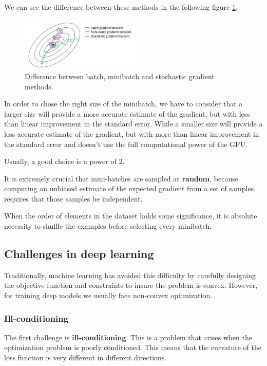 We can see the difference between these methods in the following figure \ref{fig:batchminibatch}.
\begin{figure}[!ht]
    \centering
    \includegraphics[width=0.5\textwidth]{img/minibatchvsbatch.png}
    \caption{Difference between batch, minibatch and stochastic gradient methods.}
    \label{fig:batchminibatch}
\end{figure}

In order to chose the right size of the minibatch, we have to consider that a
larger size will provide a more accurate estimate of the gradient, but with less
than linear improvement in the standard error. While a smaller size will provide
a less accurate estimate of the gradient, but with more than linear improvement
in the standard error and doesn't use the full computational power of the GPU.

\begin{note}
    Usually, a good choice is a power of 2.
\end{note}

It is extremely crucial that mini-batches are sampled at \textbf{random}, because
computing an unbiased estimate of the expected gradient from a set of samples
requires that those samples be independent.

When the order of elements in the dataset holds some significance, it is absolute
necessity to shuffle the examples before selecting every minibatch.
\subsection{Challenges in deep learning}
Traditionally, machine learning has avoided this difficulty by carefully designing
the objective function and constraints to insure the problem is convex. However,
for training deep models we usually face non-convex optimization.
\subsubsection{Ill-conditioning}
The first challenge is \textbf{ill-conditioning}. This is a problem that arises
when the optimization problem is poorly conditioned. This means that the curvature
of the loss function is very different in different directions.

